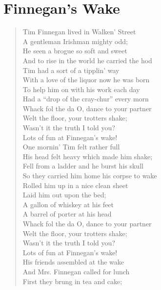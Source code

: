 \documentclass[11pt]{article}
\begin{document}
\section{Finnegan's Wake}
\label{sec:orgd1ec0cf}
\begin{verse}
Tim Finnegan lived in Walken' Street\\
A gentleman Irishman mighty odd;\\
He seen a brogue so soft and sweet\\
And to rise in the world he carried the hod\\
\vspace*{1em}
Tim had a sort of a tipplin' way\\
With a love of the liquor now he was born\\
To help him on with his work each day\\
Had a ``drop of the cray-chur'' every morn\\
\vspace*{1em}
Whack fol the da O, dance to your partner\\
Welt the floor, your trotters shake;\\
Wasn't it the truth I told you?\\
Lots of fun at Finnegan's wake!\\
One mornin' Tim felt rather full\\
His head felt heavy which made him shake;\\
Fell from a ladder and he burst his skull\\
So they carried him home his corpse to wake\\
\vspace*{1em}
Rolled him up in a nice clean sheet\\
Laid him out upon the bed;\\
A gallon of whiskey at his feet\\
A barrel of porter at his head\\
\vspace*{1em}
Whack fol the da O, dance to your partner\\
Welt the floor, your trotters shake;\\
Wasn't it the truth I told you?\\
Lots of fun at Finnegan's wake!\\
\vspace*{1em}
His friends assembled at the wake\\
And Mrs. Finnegan called for lunch\\
First they brung in tea and cake;\\

\end{verse}
\end{document}
